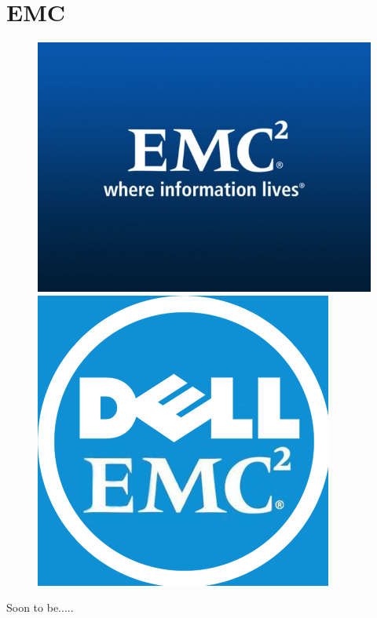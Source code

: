 \documentclass{beamer}
\theoremstyle{mystyle}
\begin{document}
\section{EMC}
\frame{\tableofcontents[currentsection]}

\begin{frame}
    \begin{figure}
        \centering
        \begin{minipage}{.5\textwidth}
            \centering
            \includegraphics[width=.8\linewidth]{EMC-Corporation.jpg}

        \end{minipage}%
        \pause
        \begin{minipage}{.5\textwidth}
            \centering
            \includegraphics[width=.7\linewidth]{Dell_EMC.png}
           
        \end{minipage}
        
    \end{figure}
    
\centering 
Soon to be.....

\end{frame}
\end{document}
